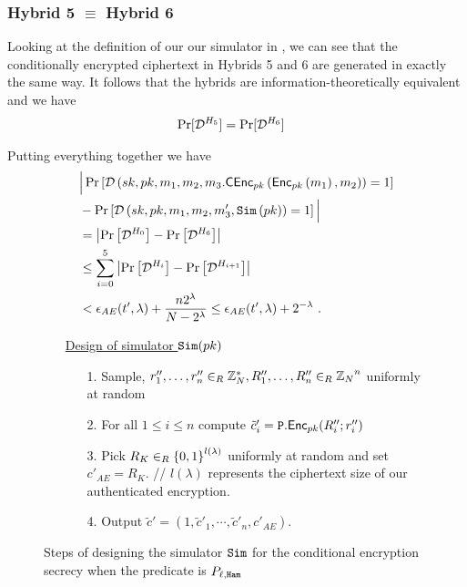 \begin{proofof}{}
\subsubsection{\textbf{Hybrid 5}  $\equiv $ \textbf{Hybrid 6}} Looking at the definition of our our simulator in , we can see that the conditionally encrypted ciphertext in Hybrids 5 and 6 are generated in exactly the same way. It follows that the hybrids are 
information-theoretically equivalent and we have 
\begin{align}
	& \Pr[{\mathcal{D}}^{H_{5}}] = \Pr[{\mathcal{D}}^{H_6} ] 
\end{align}

Putting everything together we have 
\begin{align}
&\Big| \Pr\left[{\mathcal{D}} \left(sk, pk, m_1, m_2, m_3. {\mathsf{C}}{\mathsf{Enc}}_{pk}\left({\mathsf{Enc}}_{pk}\left(m_1\right), m_2\right)\right)=1\right] \nonumber\\
&-  \Pr\left[{\mathcal{D}} \left(sk, pk, m_1, m_2, m'_3,{\mathtt{Sim}}\left(pk\right)\right)=1\right]\Big| \nonumber \\
&= \left|\Pr\left[{\mathcal{D}}^{H_0}\right]-\Pr\left[{\mathcal{D}}^{H_6}\right]\right| \nonumber \\
&\leq \sum_{i=0}^5 \left|\Pr\left[{\mathcal{D}}^{H_i}\right]-\Pr\left[{\mathcal{D}}^{H_{i+1}}\right]\right| \nonumber \\
&< \epsilon_{AE}(t',\lambda) + \frac{n2^\lambda}{N-2^{\lambda}} \leq \epsilon_{AE}(t',\lambda) + 2^{-\lambda}  \nonumber \ .
\end{align}

\begin{figure*}
		\begin{itemize}
			\item [] \underline{Design of simulator $ {\mathtt{Sim}}(pk) $}
			\begin{itemize}
				\item [1.] Sample, $ r''_1, \ldots, r''_n \in_R\mathbb{Z}^*_N, R''_1, \ldots, R''_n \in_R{\mathbb{Z}_N}^{n} $ uniformly at random  
    
				\item [2.] For all $ 1\leq i \leq n $ compute $ \tilde{c}'_i = {\mathtt{P}}.{\mathsf{Enc}}_{pk}(R''_i; r''_i ) $
				
				\item [3.] Pick $ R_K\in_R {\left\{0,1\right\}}^{l(\lambda)} $ uniformly at random and set $ c'_{AE} = R_K $.  //{\color{blue} $l(\lambda)$ represents the ciphertext size of our authenticated encryption.}

				\item [4.] Output $ \tilde{c}' = (1, \tilde{c}'_1, \cdots, \tilde{c}'_n,  c'_{AE}) $. 
			\end{itemize}
		\end{itemize}\caption{Steps of designing the simulator $ {\mathtt{Sim}} $ for the conditional encryption secrecy when the predicate is $P_{\ell, {\mathtt{Ham}}}$}
\end{figure*}

\end{proofof}


